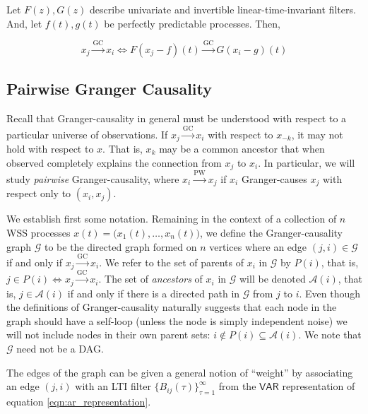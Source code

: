 \documentclass[12pt]{article}
\def\gc{\overset{\text{GC}}{\rightarrow}}  %
\def\pwgc{\overset{\text{PW}}{\rightarrow}}  %
\def\gcg{\mathcal{G}}  %
\def\VAR{\mathsf{VAR}}  %
\newcommand{\pa}[1]{P(#1)}  %
\newcommand{\anc}[1]{\mathcal{A}(#1)}  %
\begin{document}
\begin{corollary}
  Let $F(z), G(z)$ describe univariate and invertible
  linear-time-invariant filters.  And, let $f(t), g(t)$ be perfectly
  predictable processes.  Then,

  \begin{equation}
    x_j \gc x_i \iff F(x_j - f)(t) \gc G(x_i - g)(t)
  \end{equation}
\end{corollary}

\subsection{Pairwise Granger Causality}
Recall that Granger-causality in general must be understood with
respect to a particular universe of observations.  If $x_j \gc x_i$
with respect to $x_{-k}$, it may not hold with respect to $x$.  That
is, $x_k$ may be a common ancestor that when observed completely
explains the connection from $x_j$ to $x_i$.  In particular, we will
study \textit{pairwise} Granger-causality, where $x_i \pwgc x_j$ if
$x_i$ Granger-causes $x_j$ with respect only to $(x_i, x_j)$.

We establish first some notation.  Remaining in the context of a
collection of $n$ WSS processes
$x(t) = \big(x_1(t), \ldots, x_n(t)\big)$, we define the Granger-causality
graph $\gcg$ to be the directed graph formed on $n$ vertices where an
edge $(j, i) \in \gcg$ if and only if $x_j \gc x_i$.  We refer to the
set of parents of $x_i$ in $\gcg$ by $\pa{i}$, that is,
$j \in \pa{i} \iff x_j \gc x_i$.  The set of \textit{ancestors} of
$x_i$ in $\gcg$ will be denoted $\anc{i}$, that is, $j \in \anc{i}$ if
and only if there is a directed path in $\gcg$ from $j$ to $i$.  Even
though the definitions of Granger-causality naturally suggests that
each node in the graph should have a self-loop (unless the node is
simply independent noise) we will not include nodes in their own
parent sets: $i \not\in \pa{i} \subseteq \anc{i}$.  We note that $\gcg$ need not be a DAG.

The edges of the graph can be given a general notion of ``weight'' by
associating an edge $(j, i)$ with an LTI filter
$\{B_{ij}(\tau)\}_{\tau = 1}^\infty$ from the $\VAR$ representation of equation
\ref{eqn:ar_representation}.

\end{document}
